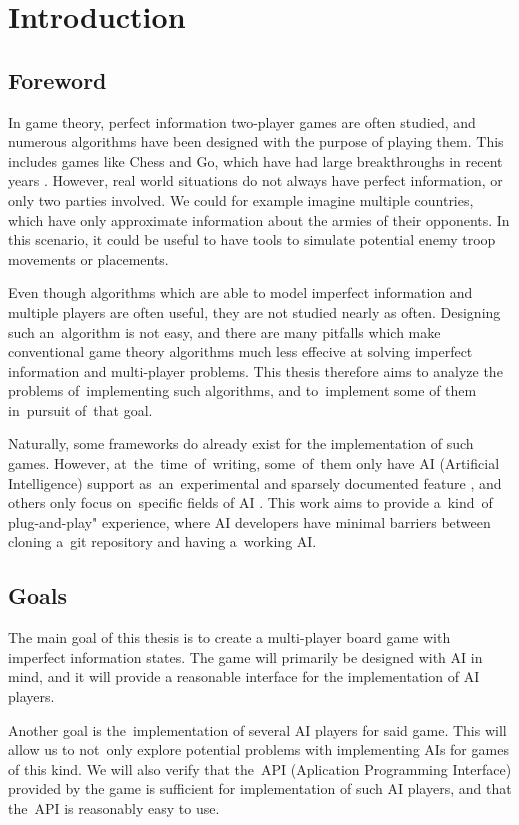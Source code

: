 \chapter*{Introduction}

\section*{Foreword}

In game theory, perfect information two-player games are often
studied, and numerous algorithms have been designed with the purpose
of playing them. This includes games like Chess and Go, which have had
large breakthroughs in recent years \cite{Silver16}. However, real world
situations do not always have perfect information, or only two parties involved.
We could for example imagine multiple countries, which have only approximate
information about the armies of their opponents. In this scenario, it could be
useful to have tools to simulate potential enemy troop movements or placements.

Even though algorithms which are able to model imperfect information and multiple
players are often useful, they are not studied nearly as often. Designing such
an~algorithm is not easy, and there are many pitfalls which make conventional
game theory algorithms much less effecive at solving imperfect information and
multi-player problems. This thesis therefore aims to analyze the problems
of~implementing such algorithms, and to~implement some of them in~pursuit of~that goal.

Naturally, some frameworks do already exist for the implementation of such games.
However, at~the~time~of~writing, some~of~them only have AI (Artificial Intelligence)
support as~an~experimental and sparsely documented feature \cite{Boardgameio},
and others only focus on~specific fields of AI \cite{Openaigym}. This work aims to provide 
a~kind~of plug-and-play" experience, where AI developers have minimal barriers between
cloning a~git repository and having a~working AI.

\section*{Goals}

The main goal of this thesis is to create a multi-player board game with
imperfect information states. The game will primarily be designed with AI
in mind, and it will provide a reasonable interface for
the implementation of AI players.

Another goal is the~implementation of several AI players for said game. This will
allow us to not~only explore potential problems with implementing AIs for games
of this kind. We will also verify that the~API (Aplication Programming Interface)
provided by the game is sufficient for implementation of such AI players, and that
the~API is reasonably easy to use.
